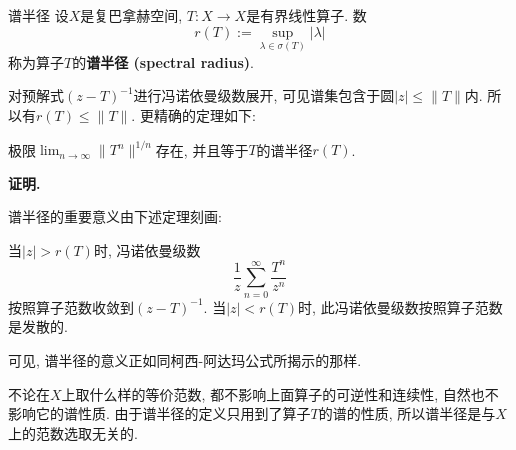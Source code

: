 
\begin{definition}{谱半径}
设$X$是复巴拿赫空间, $T:X\to X$是有界线性算子. 数
$$
r(T):=\sup_{\lambda\in\sigma(T)}|\lambda|
$$
称为算子$T$的\textbf{谱半径 (spectral radius)}.
\end{definition}

对预解式$(z-T)^{-1}$进行冯诺依曼级数展开, 可见谱集包含于圆$|z|\leq\|T\|$内. 所以有$r(T)\leq\|T\|$. 更精确的定理如下:
\begin{theorem}{}
极限$\lim_{n\to\infty}\|T^n\|^{1/n}$存在, 并且等于$T$的谱半径$r(T)$. 
\end{theorem}
\textbf{证明.} 

谱半径的重要意义由下述定理刻画:
\begin{theorem}{}
当$|z|>r(T)$时, 冯诺依曼级数
$$
\frac{1}{z}\sum_{n=0}^\infty\frac{T^n}{z^n}
$$ 
按照算子范数收敛到$(z-T)^{-1}$. 当$|z|<r(T)$时, 此冯诺依曼级数按照算子范数是发散的.
\end{theorem}

可见, 谱半径的意义正如同柯西-阿达玛公式所揭示的那样.

不论在$X$上取什么样的等价范数, 都不影响上面算子的可逆性和连续性, 自然也不影响它的谱性质. 由于谱半径的定义只用到了算子$T$的谱的性质, 所以谱半径是与$X$上的范数选取无关的. 